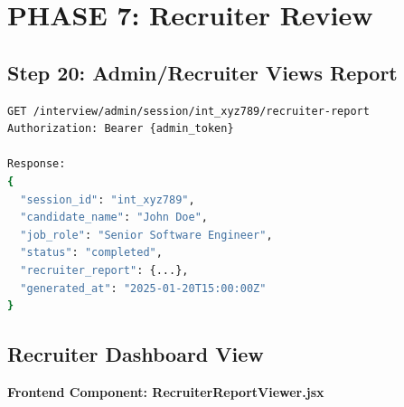 \documentclass[12pt,a4paper]{article}
\begin{document}
\newpage

\section{PHASE 7: Recruiter Review}

\subsection{Step 20: Admin/Recruiter Views Report}

\begin{lstlisting}[language=bash, caption=Get Recruiter Report API (Admin)]
GET /interview/admin/session/int_xyz789/recruiter-report
Authorization: Bearer {admin_token}

Response:
{
  "session_id": "int_xyz789",
  "candidate_name": "John Doe",
  "job_role": "Senior Software Engineer",
  "status": "completed",
  "recruiter_report": {...},
  "generated_at": "2025-01-20T15:00:00Z"
}
\end{lstlisting}

\subsection{Recruiter Dashboard View}

\textbf{Frontend Component: RecruiterReportViewer.jsx}
\end{document}
